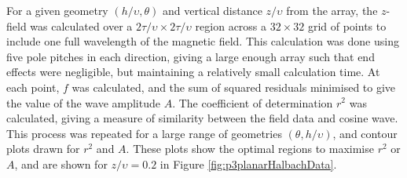 For a given geometry \(\left(h/\upsilon,\theta\right)\) and vertical distance \(z/\upsilon\) from the array, the \(z\)-field was calculated over a \(2\tau/\upsilon\times2\tau/\upsilon\) region across a \(32\times32\) grid of points to include one full wavelength of the magnetic field. This calculation was done using five pole pitches in each direction, giving a large enough array such that end effects were negligible, but maintaining a relatively small calculation time. At each point, \(f\) was calculated, and the sum of squared residuals minimised to give the value of the wave amplitude \(A\). The coefficient of determination \(r^2\) was calculated, giving a measure of similarity between the field data and cosine wave. This process was repeated for a large range of geometries \(\left(\theta, h/\upsilon\right)\), and contour plots drawn for \(r^2\) and \(A\). These plots show the optimal regions to maximise \(r^2\) or \(A\), and are shown for \(z/\upsilon = 0.2\) in Figure \ref{fig:p3planarHalbachData}.
